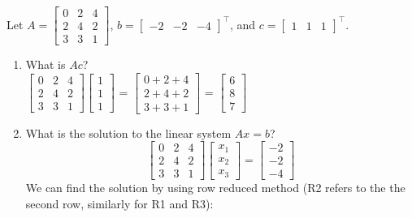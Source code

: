 \documentclass{article}
\begin{document}
\newpage
\begin{aprob}\label{prob:linsystem}
    Let $A = \begin{bmatrix} 0 & 2 & 4 \\ 2 & 4 & 2 \\ 3 & 3 & 1 \end{bmatrix}$, $b = \begin{bmatrix} -2 & -2 & -4 \end{bmatrix}^\top$, and $c=\begin{bmatrix} 1 & 1 & 1 \end{bmatrix}^\top$.
    \begin{enumerate}
    	\item {} What is $Ac$? \\
        $\begin{bmatrix} 0 & 2 & 4 \\ 2 & 4 & 2 \\ 3 & 3 & 1 \end{bmatrix} \begin{bmatrix} 1 \\ 1 \\ 1 \end{bmatrix} $
        = $\begin{bmatrix}0+2+4 \\ 2+4+2 \\ 3+3+1 \end{bmatrix}$
        = $\begin{bmatrix}6 \\ 8 \\ 7 \end{bmatrix}$
        \newpage
        \item {} What is the solution to the linear system $Ax = b$? \\
    	\[ \begin{bmatrix} 0 & 2 & 4 \\ 2 & 4 & 2 \\ 3 & 3 & 1 \end{bmatrix} \begin{bmatrix} x_1 \\ x_2 \\ x_3 \end{bmatrix}
         = \begin{bmatrix} -2 \\-2 \\-4 \end{bmatrix}\]
        We can find the solution by using row reduced method (R2 refers to the the second row, similarly for R1 and R3): \\

\end{enumerate}
\end{aprob}
\end{document}
